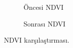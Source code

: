 \documentclass[11pt,a4paper]{article}
\begin{document}
\begin{figure}[h]
  \centering
  \begin{subfigure}[b]{0.48\textwidth}
    \centering
    \caption{Öncesi NDVI}
  \end{subfigure}\hfill
  \begin{subfigure}[b]{0.48\textwidth}
    \centering
    \caption{Sonrası NDVI}
  \end{subfigure}
  \caption{NDVI karşılaştırması.}
\end{figure}
\end{document}
